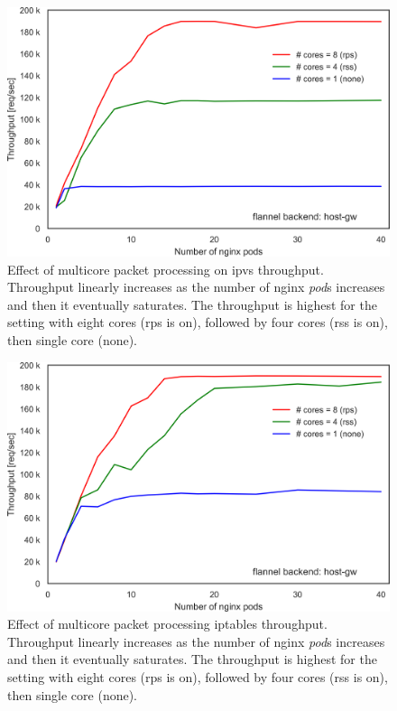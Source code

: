 \begin{figure}[h]
  \centering
  \includegraphics[width=0.8\columnwidth]{Figs/ipvs_mcore_proccessing}
  \par\bigskip
  \centering
  \begin{minipage}{0.8\columnwidth}
    \caption[Effect of multicore packet processing on ipvs throughput]{
Effect of multicore packet processing on ipvs throughput.
Throughput linearly increases as the number of nginx {\em pod}s increases and then it eventually saturates.
The throughput is highest for the setting with eight cores (rps is on), followed by four cores (rss is on), then single core (none).
    }
    \label{fig:ipvs_mcore_proccessing}
  \end{minipage}
\end{figure}


\begin{figure}[h]
  \centering
  \includegraphics[width=0.8\columnwidth]{Figs/iptables_mcore_proccessing}
  \par\bigskip
  \centering
  \begin{minipage}{0.8\columnwidth}
    \caption[Effect of multicore packet processing on iptables DNAT throughput]{
Effect of multicore packet processing iptables throughput.
Throughput linearly increases as the number of nginx {\em pod}s increases and then it eventually saturates.
The throughput is highest for the setting with eight cores (rps is on), followed by four cores (rss is on), then single core (none).
    }
    \label{fig:iptables_mcore_proccessing}
  \end{minipage}
\end{figure}


